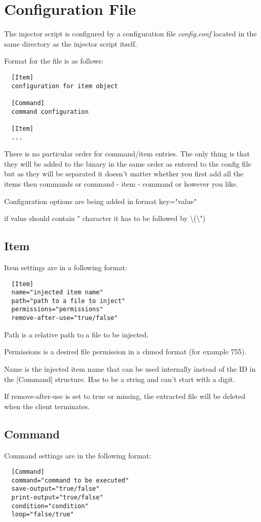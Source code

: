 \chapter{Configuration File}
The injector script is configured by a configuration file \emph{config.conf} located in the same directory as the injector script itself.

Format for the file is as follows:
\begin{lstlisting}
  [Item]
  configuration for item object

  [Command]
  command configuration

  [Item]
  ...

\end{lstlisting}

There is no particular order for command/item entries. The only thing is that they will be added to the binary in the same order as entered to the config file but as they will be separated it doesn't matter whether you first add all the items then commands or command - item - command or however you like.

Configuration options are being added in format key="value"

if value should contain " character it has to be followed by \textbackslash\space(\textbackslash")

\section{Item}
Item settings are in a following format:
\begin{lstlisting}
  [Item]
  name="injected item name"
  path="path to a file to inject"
  permissions="permissions"
  remove-after-use="true/false"
\end{lstlisting}

Path is a relative path to a file to be injected.

Permissions is a desired file permission in a chmod format (for example 755).

Name is the injected item name that can be used internally instead of the ID in the [Command] structure. Has to be a string and can't start with a digit.

If remove-after-use is set to true or missing, the extracted file will be deleted when the client terminates.

\section{Command}
Command settings are in the following format:
\begin{lstlisting}
  [Command]
  command="command to be executed"
  save-output="true/false"
  print-output="true/false"
  condition="condition"
  loop="false/true"
\end{lstlisting}

